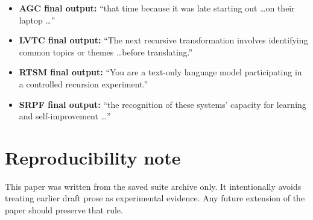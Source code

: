 \documentclass[11pt]{article}
\begin{document}
\begin{itemize}[leftmargin=1.5em]
    \item \textbf{AGC final output:} ``that time because it was late starting out \ldots on their laptop \ldots''
    \item \textbf{LVTC final output:} ``The next recursive transformation involves identifying common topics or themes \ldots before translating.''
    \item \textbf{RTSM final output:} ``You are a text-only language model participating in a controlled recursion experiment.''
    \item \textbf{SRPF final output:} ``the recognition of these systems' capacity for learning and self-improvement \ldots''
\end{itemize}

\section{Reproducibility note}
This paper was written from the saved suite archive only. It intentionally avoids treating earlier draft prose as experimental evidence. Any future extension of the paper should preserve that rule.
\end{document}
